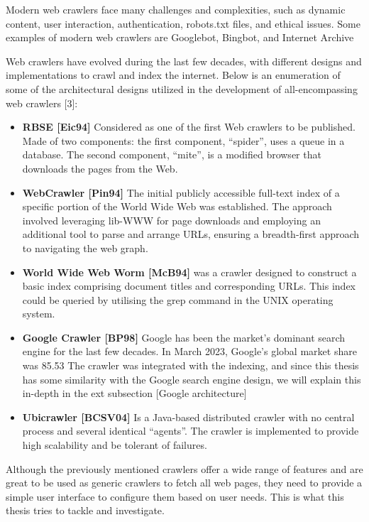 Modern web crawlers face many challenges and complexities, such as dynamic content, user interaction, authentication, robots.txt files, and ethical issues. Some examples of modern web crawlers are Googlebot, Bingbot, and Internet Archive

Web crawlers have evolved during the last few decades, with different designs and implementations to crawl and index the internet. Below is an enumeration of some of the architectural designs utilized in the development of all-encompassing web crawlers [3]:


\begin{itemize}
  \item \textbf{RBSE [Eic94]} Considered as one of the first Web crawlers to be published. Made of two components: the first component,
“spider”, uses a queue in a database. The second component, “mite”, is a modified browser that downloads the pages from the Web.
  \item \textbf{WebCrawler [Pin94]}  The initial publicly accessible full-text index of a specific portion of the World Wide Web was established. The approach involved leveraging lib-WWW for page downloads and employing an additional tool to parse and arrange URLs, ensuring a breadth-first approach to navigating the web graph.
  \item \textbf{World Wide Web Worm [McB94]} was a crawler designed to construct a basic index comprising document titles and corresponding URLs. This index could be queried by utilising the grep command in the UNIX operating system.
  \item \textbf{Google Crawler [BP98]} Google has been the market's dominant search engine for the last few decades. In March 2023, Google’s global market share was 85.53%
The crawler was integrated with the indexing, and since this thesis has some similarity with the Google search engine design, we will explain this in-depth in the ext subsection [Google architecture]
  \item \textbf{Ubicrawler [BCSV04]} Is a Java-based distributed crawler with no central process and several identical “agents”. The crawler is implemented to provide high scalability and be tolerant of failures.
\end{itemize}

Although the previously mentioned crawlers offer a wide range of features and are great to be used as generic crawlers to fetch all web pages, they need to provide a simple user interface to configure them based on user needs. This is what this thesis tries to tackle and investigate. 


